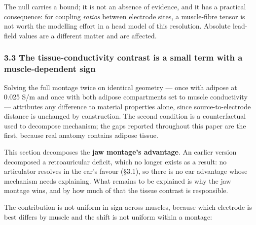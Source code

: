 \documentclass[
  11pt,
  a4paper,
]{article}
\begin{document}
The null carries a bound; it is not an absence of evidence, and it has a
practical consequence: for coupling \emph{ratios} between electrode sites, a
muscle-fibre tensor is not worth the modelling effort in a head model of this
resolution. Absolute lead-field values are a different matter and are affected.

\subsubsection{3.3 The tissue-conductivity contrast is a small term with a muscle-dependent sign}\label{the-tissue-conductivity-contrast-is-a-small-term-with-a-muscle-dependent-sign}

Solving the full montage twice on identical geometry --- once with adipose at
0.025 S/m and once with both adipose compartments set to muscle conductivity ---
attributes any difference to material properties alone, since source-to-electrode
distance is unchanged by construction. The second condition is a counterfactual
used to decompose mechanism; the gaps reported throughout this paper are the
first, because real anatomy contains adipose tissue.

This section decomposes the \textbf{jaw montage's advantage}. An earlier version
decomposed a retroauricular deficit, which no longer exists as a result: no
articulator resolves in the ear's favour (§3.1), so there is no ear advantage
whose mechanism needs explaining. What remains to be explained is why the jaw
montage wins, and by how much of that the tissue contrast is responsible.

The contribution is not uniform in sign across muscles, because which electrode
is best differs by muscle and the shift is not uniform within a montage:
\end{document}
